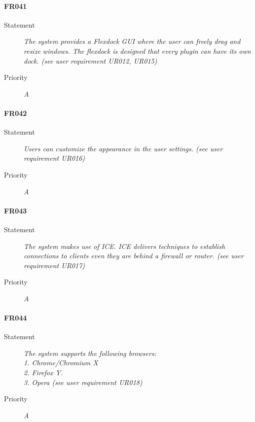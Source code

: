\paragraph{FR041}
\begin{description}
  \item[Statement]
    \textit{The system provides a \gls{Flexdock} GUI where the user can freely drag and resize windows. The flexdock is designed that every plugin can have its own dock. (see user requirement UR012, UR015)}
  \item[Priority]
    \textit{A}
\end{description}


\paragraph{FR042}
\begin{description}
  \item[Statement]
    \textit{Users can customize the appearance in the user settings. (see user requirement UR016)}
  \item[Priority]
    \textit{A}
\end{description}


\paragraph{FR043}
\begin{description}
  \item[Statement]
    \textit{The system makes use of \gls{ICE}. ICE delivers techniques to establish connections to clients even they are behind a firewall or router.  (see user requirement UR017)}
  \item[Priority]
    \textit{A}
\end{description}


\paragraph{FR044}
\begin{description}
  \item[Statement]
    \textit{The system supports the following
      browsers:\\1. Chrome/Chromium X\\2. Firefox Y.\\ 3. Opera (see user requirement UR018)}
  \item[Priority]
    \textit{A}
\end{description}


